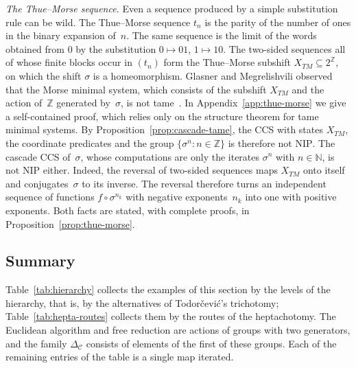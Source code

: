 \documentclass[psamsfonts]{amsart}
\theoremstyle{definition}
\theoremstyle{remark}
\newcommand{\NIP}{\text{NIP}}
\numberwithin{equation}{section}
\begin{document}
\emph{The Thue--Morse sequence.}
Even a sequence produced by a simple substitution rule can be wild.
The Thue--Morse sequence $t_n$ is the parity of the number of ones in the binary
expansion of~$n$.
The same sequence is the limit of the words obtained from $0$ by the
substitution $0\mapsto01$, $1\mapsto10$.
The two-sided sequences all of whose finite blocks occur in $(t_n)$ form the
Thue--Morse subshift $X_{TM}\subseteq2^{\mathbb{Z}}$, on which the shift $\sigma$ is a
homeomorphism.
Glasner and Megrelishvili observed that the Morse minimal system, which consists of the subshift $X_{TM}$ and the action of~$\mathbb{Z}$ generated by~$\sigma$, is not tame~\cite{GlasnerMegrelishvili2018}.
In Appendix~\ref{app:thue-morse} we give a self-contained proof, which relies only on the structure theorem for tame minimal systems.
By Proposition~\ref{prop:cascade-tame}, the CCS with states $X_{TM}$, the coordinate predicates and the group
$\{\sigma^n:n\in\mathbb{Z}\}$ is therefore not $\NIP$.
The cascade CCS of~$\sigma$, whose computations are only the iterates $\sigma^n$ with $n\in\mathbb{N}$, is not $\NIP$ either.
Indeed, the reversal of two-sided sequences maps $X_{TM}$ onto itself and conjugates~$\sigma$ to its inverse.
The reversal therefore turns an independent sequence of functions $f\circ\sigma^{n_k}$ with negative exponents~$n_k$ into one with positive exponents.
Both facts are stated, with complete proofs, in Proposition~\ref{prop:thue-morse}.


\subsection{Summary}
Table~\ref{tab:hierarchy} collects the examples of this section by the levels of the hierarchy, that is, by the alternatives of Todorčević's trichotomy; Table~\ref{tab:hepta-routes} collects them by the routes of the heptachotomy.
The Euclidean algorithm and free reduction are actions of groups with two
generators, and the family $\Delta_{\mathcal{C}}$ consists of elements of the first of these groups.
Each of the remaining entries of the table is a single map iterated.
\end{document}
